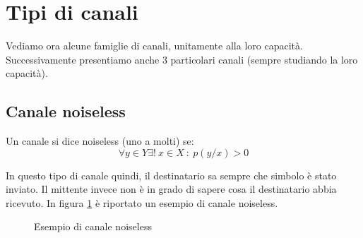 \section{Tipi di canali}
Vediamo ora alcune famiglie di canali, unitamente alla loro capacità.
Successivamente presentiamo anche 3 particolari canali (sempre studiando la loro capacità).

\subsection{Canale noiseless}

\medskip

\begin{definizione}
 Un canale si dice noiseless (uno a molti) se:
\[
 \forall y \in Y \exists ! \ x \in X \ : \ p(y/x) > 0
\]
\end{definizione}

In questo tipo di canale quindi, il destinatario sa sempre che simbolo è stato inviato.
Il mittente invece non è in grado di sapere cosa il destinatario abbia ricevuto.
In figura \ref{fig:noiseless} è riportato un esempio di canale noiseless.

\begin{figure}[htbp]
  \centering
  \hspace{1cm}
  \caption{Esempio di canale noiseless}
  \label{fig:noiseless}
\end{figure}


